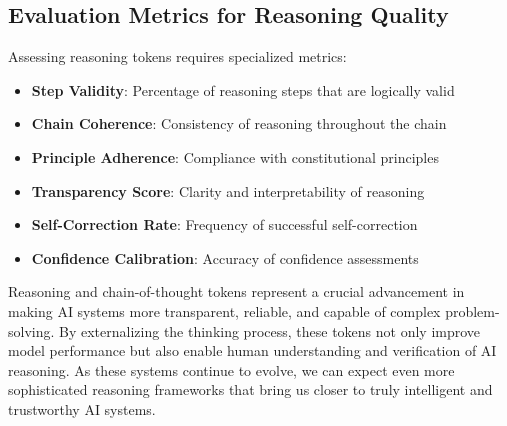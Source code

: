 \subsection{Evaluation Metrics for Reasoning Quality}

Assessing reasoning tokens requires specialized metrics:

\begin{itemize}
\item \textbf{Step Validity}: Percentage of reasoning steps that are logically valid
\item \textbf{Chain Coherence}: Consistency of reasoning throughout the chain
\item \textbf{Principle Adherence}: Compliance with constitutional principles
\item \textbf{Transparency Score}: Clarity and interpretability of reasoning
\item \textbf{Self-Correction Rate}: Frequency of successful self-correction
\item \textbf{Confidence Calibration}: Accuracy of confidence assessments
\end{itemize}

Reasoning and chain-of-thought tokens represent a crucial advancement in making AI systems more transparent, reliable, and capable of complex problem-solving. By externalizing the thinking process, these tokens not only improve model performance but also enable human understanding and verification of AI reasoning. As these systems continue to evolve, we can expect even more sophisticated reasoning frameworks that bring us closer to truly intelligent and trustworthy AI systems.
